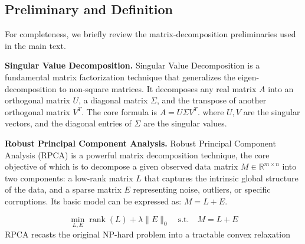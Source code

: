 \subsection{Preliminary and Definition}
\label{sec:preliminaries}
For completeness, we briefly review the matrix-decomposition preliminaries used in the main text.

\noindent\textbf{Singular Value Decomposition.} Singular Value Decomposition is a fundamental matrix factorization technique that generalizes the eigen-decomposition to non-square matrices\cite{SVD}. It decomposes any real matrix $A$ into an orthogonal matrix $U$, a diagonal matrix $\Sigma$, and the transpose of another orthogonal matrix $V^T$. The core formula is $A = U \Sigma V^T$.
where $U,V$ are the singular vectors, and the diagonal entries of $\Sigma$ are the singular values. 

\noindent\textbf{Robust Principal Component Analysis.} Robust Principal Component Analysis (RPCA) is a powerful matrix decomposition technique\cite{RPCA}, the core objective of which is to decompose a given observed data matrix $M \in \mathbb{R}^{m \times n}$ into two components: a low-rank matrix $L$ that captures the intrinsic global structure of the data, and a sparse matrix $E$ representing noise, outliers, or specific corruptions. Its basic model can be expressed as: $M=L+E$.

\begin{equation}
    \min_{L, E} \operatorname{rank}(L) + \lambda \|E\|_0 \quad \text{s.t.} \quad M = L + E \label{eq:RPCA-origin}
\end{equation}
RPCA recasts the original NP-hard problem into a tractable convex relaxation

